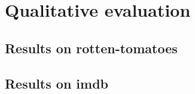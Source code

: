 \section{Qualitative evaluation}\label{sec:qualitative-evaluation}

\subsection{Results on rotten-tomatoes}\label{subsec:results-rotten-tomatoes}


\subsection{Results on imdb}\label{subsec:results-imdb}

